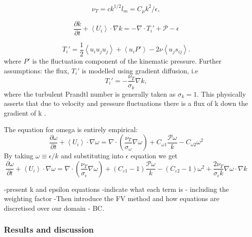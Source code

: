 \documentclass[12pt,oneside,a4paper]{article}
\newcommand{\pdev}[2]{\frac{\partial {#1}}{\partial {#2}}}
\begin{document}
\begin{equation}
\nu_T = c k^{1/2} l_m = C_\mu k^2/\epsilon,
\end{equation}


\begin{equation}
\pdev{k}{t} + \left< U_i \right> \cdot \nabla k = -\nabla \cdot T_i' + \mathcal{P} - \epsilon 
\end{equation}

\begin{equation}
T_i' = \frac{1}{2} \left< u_i u_j u_j \right> + \left< u_i P' \right> - 2 \nu \left< u_j s_{ij} \right>.
\end{equation}
where $P'$ is the fluctuation component of the kinematic pressure. Further assumptions: the flux, $T_i'$ is modelled using gradient diffusion, i.e 
\begin{equation}
T_i' = -\frac{\nu_T}{\sigma_{k}} \nabla k,
\end{equation}
where the turbulent Prandtl number is generally taken as $\sigma_k=1$. This physically asserts that due to velocity and pressure fluctuations there is a flux of k down the gradient of k \citep{pope2001}.

The equation for omega is entirely empirical:
\begin{equation}
\pdev{\omega}{t}  + \left< U_i \right> \cdot \nabla \omega = \nabla \cdot \left( \frac{\nu_T}{\sigma_{\omega}} \nabla \omega \right) + C_{\omega 1} \frac{\mathcal{P} \omega}{k} - C_{\omega 2} \omega^2
\end{equation}
By taking $\omega \equiv \epsilon /k$ and substituting into $\epsilon$ equation we get
\begin{equation}
\pdev{\omega}{t}  + \left< U_i \right> \cdot \nabla \omega = \nabla \cdot \left( \frac{\nu_T}{\sigma_{\epsilon}} \nabla \omega \right) + (C_{\varepsilon 1}-1) \frac{\mathcal{P} \omega}{k} - (C_{\varepsilon 2}-1) \omega^2 + \frac{2 \nu_T}{\sigma_\epsilon k}\nabla \omega \cdot \nabla k
\end{equation}


-present k and epsilon equations
-indicate what each term is - including the weighting factor
-Then introduce the FV method and how equations are discretised over our domain - BC. 


\newpage

\subsubsection{Results and discussion}
\end{document}
